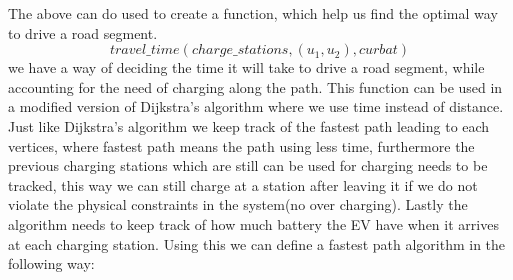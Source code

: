 The above can do used to create a function, which help us find the optimal way to drive a road segment. 
\[travel\_time(charge\_stations, (u_1, u_2), curbat) \]
we have a way of deciding the time it will take to drive a road segment, while accounting for the need of charging along the path. This function can be used in a modified version of Dijkstra's algorithm where we use time instead of distance. Just like Dijkstra's algorithm we keep track of the fastest path leading to each vertices, where fastest path means the path using less time, furthermore the previous charging stations which are still can be used for charging needs to be tracked, this way we can still charge at a station after leaving it if we do not violate the physical constraints in the system(no over charging). Lastly the algorithm needs to keep track of how much battery the EV have when it arrives at each charging station. Using this we can define a fastest path algorithm in the following way: 
